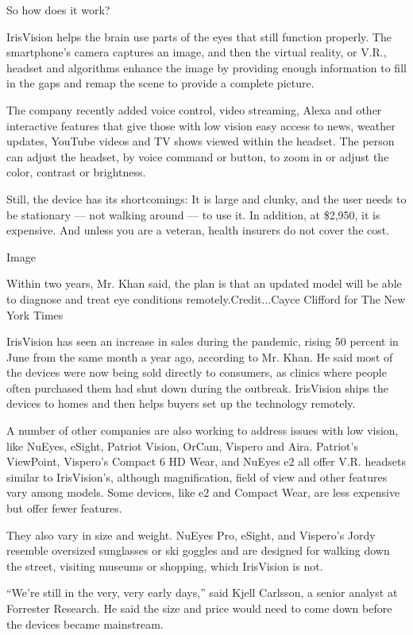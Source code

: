 So how does it work?

IrisVision helps the brain use parts of the eyes that still function
properly. The smartphone's camera captures an image, and then the
virtual reality, or V.R., headset and algorithms enhance the image by
providing enough information to fill in the gaps and remap the scene to
provide a complete picture.

The company recently added voice control, video streaming, Alexa and
other interactive features that give those with low vision easy access
to news, weather updates, YouTube videos and TV shows viewed within the
headset. The person can adjust the headset, by voice command or button,
to zoom in or adjust the color, contrast or brightness.

Still, the device has its shortcomings: It is large and clunky, and the
user needs to be stationary --- not walking around --- to use it. In
addition, at \$2,950, it is expensive. And unless you are a veteran,
health insurers do not cover the cost.

Image

Within two years, Mr. Khan said, the plan is that an updated model will
be able to diagnose and treat eye conditions remotely.Credit...Cayce
Clifford for The New York Times

IrisVision has seen an increase in sales during the pandemic, rising 50
percent in June from the same month a year ago, according to Mr. Khan.
He said most of the devices were now being sold directly to consumers,
as clinics where people often purchased them had shut down during the
outbreak. IrisVision ships the devices to homes and then helps buyers
set up the technology remotely.

A number of other companies are also working to address issues with low
vision, like NuEyes, eSight, Patriot Vision, OrCam, Vispero and Aira.
Patriot's ViewPoint, Vispero's Compact 6 HD Wear, and NuEyes e2 all
offer V.R. headsets similar to IrisVision's, although magnification,
field of view and other features vary among models. Some devices, like
e2 and Compact Wear, are less expensive but offer fewer features.

They also vary in size and weight. NuEyes Pro, eSight, and Vispero's
Jordy resemble oversized sunglasses or ski goggles and are designed for
walking down the street, visiting museums or shopping, which IrisVision
is not.

``We're still in the very, very early days,'' said Kjell Carlsson, a
senior analyst at Forrester Research. He said the size and price would
need to come down before the devices became mainstream.

